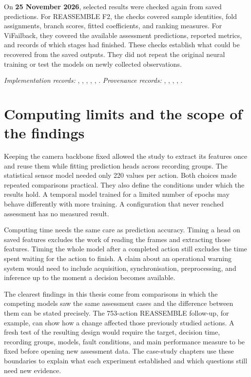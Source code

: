 On \textbf{25 November 2026}, selected results were checked again from saved predictions. For REASSEMBLE F2, the checks covered sample identities, fold assignments, branch scores, fitted coefficients, and ranking measures. For ViFailback, they covered the available assessment predictions, reported metrics, and records of which stages had finished. These checks establish what could be recovered from the saved outputs. They did not repeat the original neural training or test the models on newly collected observations.

\noindent\textit{Implementation records:} , , , , , . \textit{Provenance records:} , , , , .

\section{Computing limits and the scope of the findings}
\label{sec:ch4-boundaries}

Keeping the camera backbone fixed allowed the study to extract its features once and reuse them while fitting prediction heads across recording groups. The statistical sensor model needed only 220 values per action. Both choices made repeated comparisons practical. They also define the conditions under which the results hold. A temporal model trained for a limited number of epochs may behave differently with more training. A configuration that never reached assessment has no measured result.

Computing time needs the same care as prediction accuracy. Timing a head on saved features excludes the work of reading the frames and extracting those features. Timing the whole model after a completed action still excludes the time spent waiting for the action to finish. A claim about an operational warning system would need to include acquisition, synchronisation, preprocessing, and inference up to the moment a decision becomes available.

The clearest findings in this thesis come from comparisons in which the competing models saw the same assessment cases and the difference between them can be stated precisely. The 753-action REASSEMBLE follow-up, for example, can show how a change affected those previously studied actions. A fresh test of the resulting design would require the target, decision time, recording groups, models, fault conditions, and main performance measure to be fixed before opening new assessment data. The case-study chapters use these boundaries to explain what each experiment established and which questions still need new evidence.
